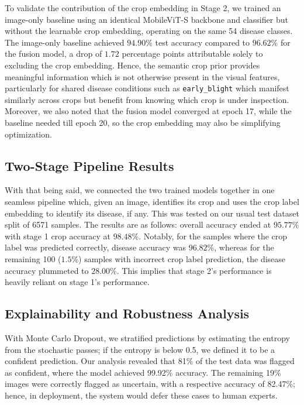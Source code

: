 \documentclass[runningheads]{llncs}
\begin{document}
To validate the contribution of the crop embedding in Stage 2, we trained an image-only baseline using an identical MobileViT-S backbone and classifier but without the learnable crop embedding, operating on the same 54 disease classes. The image-only baseline achieved $94.90\%$ test accuracy compared to $96.62\%$ for the fusion model, a drop of $1.72$ percentage points attributable solely to excluding the crop embedding. Hence, the semantic crop prior provides meaningful information which is not otherwise present in the visual features, particularly for shared disease conditions such as \texttt{early\_blight} which manifest similarly across crops but benefit from knowing which crop is under inspection. Moreover, we also noted that the fusion model converged at epoch 17, while the baseline needed till epoch 20, so the crop embedding may also be simplifying optimization.

\subsection{Two-Stage Pipeline Results}

With that being said, we connected the two trained models together in one seamless pipeline which, given an image, identifies its crop and uses the crop label embedding to identify its disease, if any. This was tested on our usual test dataset split of 6571 samples. The results are as follows: overall accuracy ended at $95.77\%$ with stage 1 crop accuracy at $98.48\%$. Notably, for the samples where the crop label was predicted correctly, disease accuracy was $96.82\%$, whereas for the remaining 100 ($1.5\%$) samples with incorrect crop label prediction, the disease accuracy plummeted to $28.00\%$. This implies that stage 2's performance is heavily reliant on stage 1's performance.

\subsection{Explainability and Robustness Analysis}

With Monte Carlo Dropout, we stratified predictions by estimating the entropy from the stochastic passes; if the entropy is below 0.5, we defined it to be a confident prediction. Our analysis revealed that 81\% of the test data was flagged as confident, where the model achieved 99.92\% accuracy. The remaining 19\% images were correctly flagged as uncertain, with a respective accuracy of 82.47\%; hence, in deployment, the system would defer these cases to human experts.
\end{document}
